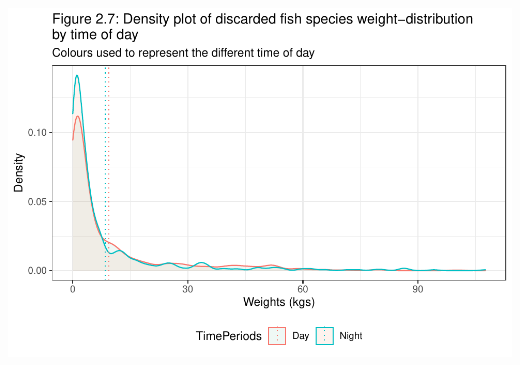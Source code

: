 \documentclass[
]{book}
\begin{document}
\begin{center}\includegraphics{bookdown-demo_files/figure-latex/unnamed-chunk-19-1} \end{center}
\end{document}
